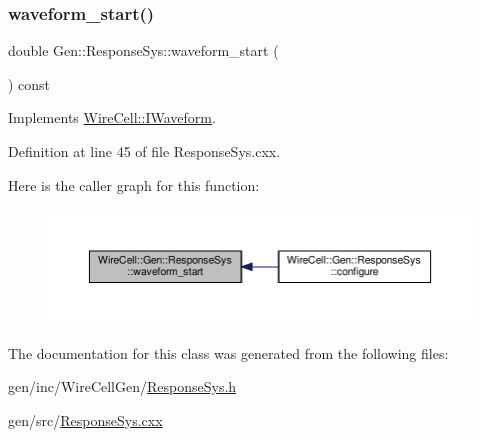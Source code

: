 \subsubsection{\texorpdfstring{waveform\+\_\+start()}{waveform\_start()}}
{\footnotesize\ttfamily double Gen\+::\+Response\+Sys\+::waveform\+\_\+start (\begin{DoxyParamCaption}{ }\end{DoxyParamCaption}) const\hspace{0.3cm}{\ttfamily [virtual]}}



Implements \hyperlink{class_wire_cell_1_1_i_waveform_ac7dfdf92e835bf708838bcdc1ba91ba2}{Wire\+Cell\+::\+I\+Waveform}.



Definition at line 45 of file Response\+Sys.\+cxx.

Here is the caller graph for this function\+:
\nopagebreak
\begin{figure}[H]
\begin{center}
\leavevmode
\includegraphics[width=350pt]{class_wire_cell_1_1_gen_1_1_response_sys_a7b431ba8fb1668bd0b067f5f03b53171_icgraph}
\end{center}
\end{figure}


The documentation for this class was generated from the following files\+:\begin{DoxyCompactItemize}
\item 
gen/inc/\+Wire\+Cell\+Gen/\hyperlink{_response_sys_8h}{Response\+Sys.\+h}\item 
gen/src/\hyperlink{_response_sys_8cxx}{Response\+Sys.\+cxx}\end{DoxyCompactItemize}
